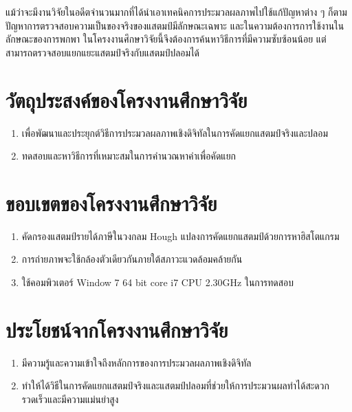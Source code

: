 แม้ว่าจะมีงานวิจัยในอดีตจำนวนมากที่ได้นำเอาเทคนิคการประมวลผลภาพไปใช้แก้ปัญหาต่าง ๆ ก็ตาม ปัญหาการตรวจสอบความเป็นของจริงของแสตมป์มีลักษณะเฉพาะ และในความต้องการการใช้งานในลักษณะของการพกพา ในโครงงานศึกษาวิจัยนี้จึงต้องการค้นหาวิธีการที่มีความซับซ้อนน้อย แต่สามารถตรวจสอบแยกแยะแสตมป์จริงกับแสตมป์ปลอมได้

\section{วัตถุประสงค์ของโครงงานศึกษาวิจัย}
\begin{enumerate}
\item เพื่อพัฒนาและประยุกต์วิธีการประมวลผลภาพเชิงดิจิทัลในการคัดแยกแสตมป์จริงและปลอม
\item ทดสอบและหาวิธีการที่เหมาะสมในการคำนวณหาค่าเพื่อคัดแยก
\end{enumerate}

\section{ขอบเขตของโครงงานศึกษาวิจัย}
\begin{enumerate}
\item คัดกรองแสตมป์รายได้ภาษีในวงกลม Hough แปลงการคัดแยกแสตมป์ด้วยการหาฮิสโตแกรม
\item การถ่ายภาพจะใช้กล้องตัวเดียวกันภายใต้สภาวะแวดล้อมคล้ายกัน
\item ใช้คอมพิวเตอร์ Window 7 64 bit core i7 CPU 2.30GHz ในการทดสอบ
\end{enumerate}
\newpage

\section{ประโยชน์จากโครงงานศึกษาวิจัย}
\begin{enumerate}
\item มีความรู้และความเข้าใจถึงหลักการของการประมวลผลภาพเชิงดิจิทัล
\item ทำให้ได้วิธีในการคัดแยกแสตมป์จริงและแสตมป์ปลอมที่ช่วยให้การประมวนผลทำได้สะดวกรวดเร็วและมีความแม่นยำสูง
\end{enumerate}

